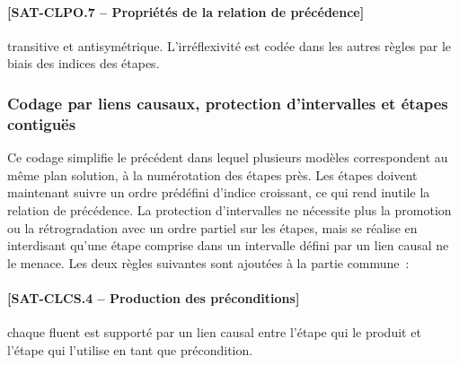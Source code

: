 {\paragraph*{[SAT-CLPO.7 -- Propriétés de la relation de précédence]} transitive et
  antisymétrique. L'irréflexivité est codée dans les autres règles par le biais
  des indices des étapes.

\subsubsection{Codage par liens causaux, protection d'intervalles et étapes contiguës}

Ce codage simplifie le précédent dans lequel plusieurs modèles correspondent au
même plan solution, à la numérotation des étapes près. Les étapes doivent
maintenant suivre un ordre prédéfini d'indice croissant, ce qui rend inutile la
relation de précédence. La protection d'intervalles ne nécessite plus la
promotion ou la rétrogradation avec un ordre partiel sur les étapes, mais se
réalise en interdisant qu'une étape comprise dans un intervalle défini par un
lien causal ne le menace. Les deux règles suivantes sont ajoutées à la partie
commune~:

\paragraph*{[SAT-CLCS.4 -- Production des préconditions]} chaque fluent est supporté par un
  lien causal entre l'étape qui le produit et l'étape qui l'utilise en tant que
  précondition.
}
